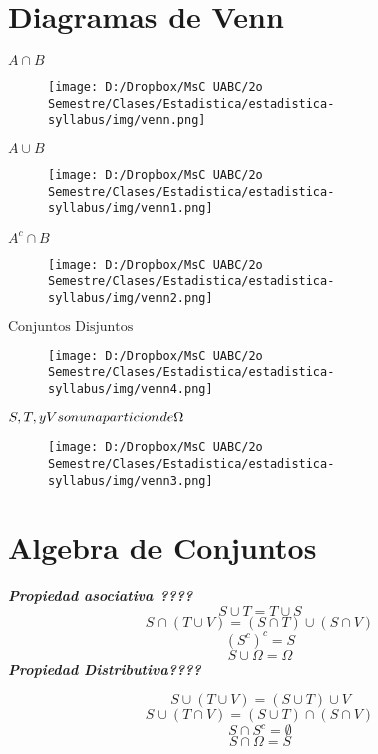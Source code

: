 \documentclass[]{book}
\begin{document}
\section{Diagramas de Venn}\label{diagramas-de-venn}

 \(A \cap B\)

\begin{figure}[htbp]
\centering
\texttt{[image: D:/Dropbox/MsC UABC/2o Semestre/Clases/Estadistica/estadistica-syllabus/img/venn.png]}
\caption{}
\end{figure}

\(A\cup B\)

\begin{figure}[htbp]
\centering
\texttt{[image: D:/Dropbox/MsC UABC/2o Semestre/Clases/Estadistica/estadistica-syllabus/img/venn1.png]}
\caption{}
\end{figure}

\(A^c \cap B\)

\begin{figure}[htbp]
\centering
\texttt{[image: D:/Dropbox/MsC UABC/2o Semestre/Clases/Estadistica/estadistica-syllabus/img/venn2.png]}
\caption{}
\end{figure}

\(\text{Conjuntos Disjuntos}\)

\begin{figure}[htbp]
\centering
\texttt{[image: D:/Dropbox/MsC UABC/2o Semestre/Clases/Estadistica/estadistica-syllabus/img/venn4.png]}
\caption{}
\end{figure}

\(S,T,\space y \space V \space son \space una \space particion \space de \space \Omega\)

\begin{figure}[htbp]
\centering
\texttt{[image: D:/Dropbox/MsC UABC/2o Semestre/Clases/Estadistica/estadistica-syllabus/img/venn3.png]}
\caption{}
\end{figure}

\section{Algebra de Conjuntos}\label{algebra-de-conjuntos}

\textbf{\emph{Propiedad asociativa ????}} \[S \cup T = T \cup S\]
\[S \cap (T \cup V) = (S \cap T) \cup (S \cap V)\] \[(S^c)^c = S\]
\[S \cup \Omega = \Omega\] \textbf{\emph{Propiedad Distributiva????}}

\[S \cup (T \cup V) = (S \cup T)\cup V\]
\[S \cup (T \cap V) = (S \cup T)\cap (S \cap V)\]
\[S \cap S^c = \emptyset\] \[S \cap \Omega = S\]
\end{document}
